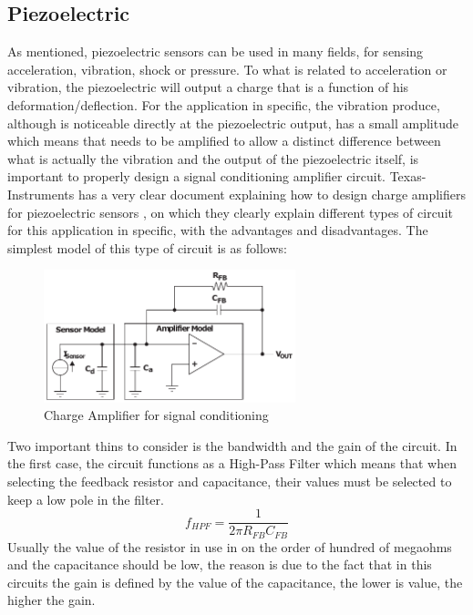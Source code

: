 \subsection{Piezoelectric}
As mentioned, piezoelectric sensors can be used in many fields, for sensing acceleration, vibration, shock or pressure. To what is related to acceleration or vibration, the piezoelectric will output a charge that is a function of his deformation/deflection. For the application in specific, the vibration produce, although is noticeable directly at the piezoelectric output, has a small amplitude which means that needs to be amplified to allow a distinct difference between what is actually the vibration and the output of the piezoelectric itself, is important to properly design a signal conditioning amplifier circuit. Texas-Instruments has a very clear document explaining how to design charge amplifiers for piezoelectric sensors \cite{bartolomeSignalConditioningPiezoelectric2010}, on which they clearly explain different types of circuit for this application in specific, with the advantages and disadvantages. The simplest model of this type of circuit is as follows: 
\begin{figure}[!htb]
    \centering
    \includegraphics[width=0.65\textwidth]{Chapters/4CHP/Figures/singleenddedchargeamp.pdf}
    \caption{Charge Amplifier for signal conditioning}
    \label{fig:ChargeAmpSimp}
\end{figure}
Two important thins to consider is the bandwidth and the gain of the circuit. In the first case, the circuit functions as a High-Pass Filter which means that when selecting the feedback resistor and capacitance, their values must be selected to keep a low pole in the filter.
\begin{equation}\label{eq:fhpf}
    f_{HPF} = \frac{1}{2\pi R_{FB}C_{FB}}
\end{equation}
Usually the value of the resistor in use in on the order of hundred of megaohms and the capacitance should be low, the reason is due to the fact that in this circuits the gain is defined by the value of the capacitance, the lower is value, the higher the gain.

